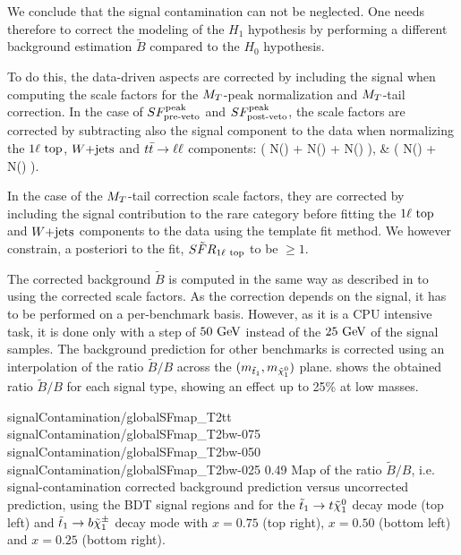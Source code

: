     We conclude that the signal contamination can not be neglected. One needs therefore to
    correct the modeling of the $H_1$ hypothesis by performing a different background
    estimation $\tilde{B}$ compared to the $H_0$ hypothesis.

    To do this, the data-driven aspects are corrected by including the signal when computing the scale factors for the
    $M_T$-peak normalization and $M_T$-tail correction. In the case of $SF_{\text{pre-veto}}^{\text{peak}}$ and $SF_{\text{post-veto}}^{\text{peak}}$, the scale factors
    are corrected by subtracting also the signal component to the data when normalizing the $1\ell~\text{top}$, $\text{$W$+jets}$
    and $t\bar{t} \rightarrow \ell \ell$ components:
    {
        \SFpreTilde
        \left(
                 {N(\oneLeptonTop) + N(\Wjets) + N(\diLeptonTop)}
        \right),
     }
     {
        \SFpostTilde
        & 
        \left(
                 {N(\oneLeptonTop) + N(\Wjets)}
        \right).
    }

    In the case of the $M_T$-tail correction scale factors, they are corrected by including the signal contribution
    to the rare category before fitting the $1\ell~\text{top}$ and $\text{$W$+jets}$ components to the data using the template
    fit method. We however constrain, a posteriori to the fit, $\tilde{SFR}_{1\ell~\text{top}}$ to be $\geq 1$.

    The corrected background $\tilde{B}$ is computed in the same way as described in
     to  using the
    corrected scale factors. As the correction depends on the signal, it has to be
    performed on a per-benchmark basis. However, as it is a CPU intensive task, it is done
    only with a step of $50 ~\text{GeV}$ instead of the $25 ~\text{GeV}$ of the signal samples. The
    background prediction for other benchmarks is corrected using an interpolation of the
    ratio $\tilde{B}/B$ across the $(m_{\tilde{t}_1},m_{\tilde{\chi}_1^0})$ plane.
     shows the obtained ratio $\tilde{B}/B$ for each
    signal type, showing an effect up to 25\% at low masses.

                      {signalContamination/globalSFmap_T2tt}
                      {signalContamination/globalSFmap_T2bw-075}
                      {signalContamination/globalSFmap_T2bw-050}
                      {signalContamination/globalSFmap_T2bw-025}
                      {0.49}
                      {Map of the ratio $\tilde{B}/B$, i.e. signal-contamination corrected background prediction versus uncorrected prediction, using the BDT signal regions and for the $\tilde{t}_1 \rightarrow t \tilde{\chi}_1^0$ decay mode (top left) and $\tilde{t}_1 \rightarrow b \tilde{\chi}_1^\pm$ decay mode with $x=0.75$ (top right), $x=0.50$ (bottom left) and $x=0.25$ (bottom right).}


